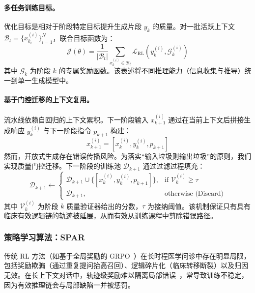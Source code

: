 \paragraph{多任务训练目标。}
优化目标是相对于阶段特定目标提升生成片段 $y_k$ 的质量。对一批活跃上下文 $\mathcal{B}_t = \{x_{k_i}^{(i)}\}_{i=1}^N$，联合目标函数为：
\begin{equation}
    \mathcal{J}(\theta) = \frac{1}{|\mathcal{B}_t|} \sum_{x_{k}^{(i)} \in \mathcal{B}_t} \mathcal{L}_{\text{RL}} \left( y_{k}^{(i)}, \mathcal{G}_{k}^{(i)} \right)
\end{equation}
其中 $\mathcal{G}_k$ 为阶段 $k$ 的专属奖励函数。该表述将不同推理能力（信息收集与推导）统一到单一生成模型中。

\paragraph{基于门控迁移的上下文复用。}
流水线依赖自回归的上下文累积。下一阶段输入 $x_{k+1}^{(i)}$ 通过在当前上下文后拼接生成响应 $y_{k}^{(i)}$ 与下一阶段指令 $p_{k+1}$ 构建：
\begin{equation}
    x_{k+1}^{(i)} = [ x_{k}^{(i)}, y_{k}^{(i)}, p_{k+1} ]
\end{equation}
然而，开放式生成存在错误传播风险。为落实“输入垃圾则输出垃圾”的原则，我们实现质量门控迁移。下一阶段的训练池 $\mathcal{D}_{k+1}$ 通过过滤过程填充：
\begin{equation}
    \mathcal{D}_{k+1} \leftarrow 
    \begin{cases} 
        \mathcal{D}_{k+1} \cup \{ [ x_{k}^{(i)}, y_{k}^{(i)}, p_{k+1} ] \}, & \text{if } \mathcal{V}_{k}^{(i)} \ge \tau \\
        \mathcal{D}_{k+1}, & \text{otherwise (Discard)}
    \end{cases}
\end{equation}
其中 $\mathcal{V}_{k}^{(i)}$ 为阶段 $k$ 质量验证器给出的分数，$\tau$ 为接纳阈值。该机制保证只有具有临床有效逻辑链的轨迹被延展，从而有效从训练课程中剪除错误路径。

\subsubsection{策略学习算法：SPAR}
传统 RL 方法（如基于全局奖励的 GRPO~\cite{guo2025deepseek, DBLP:journals/corr/abs-2509-02333}）在长时程医学问诊中存在明显局限，包括奖励欺骗（通过重复提问抬高召回）、逻辑碎片化（临床转移断裂）以及归因无效。在长上下文对话中，轨迹级奖励难以隔离局部错误~\cite{zhang2025lets}，常导致训练不稳定，因为有效推理链会与局部缺陷一并被惩罚。

